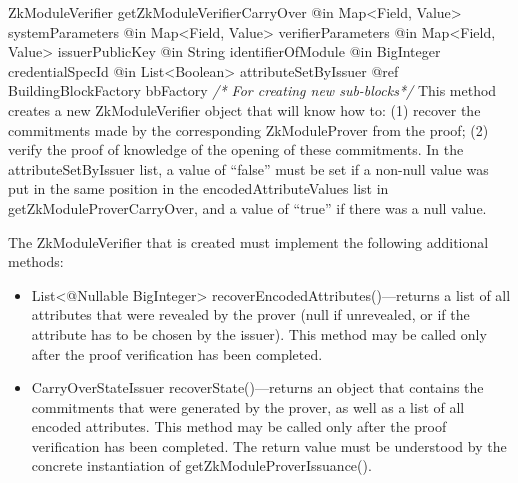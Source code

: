       \begin{method}
      {ZkModuleVerifier}
      {getZkModuleVerifierCarryOver}
      {
        {@in Map<Field, Value> systemParameters}
        {@in Map<Field, Value> verifierParameters}
        {@in Map<Field, Value> issuerPublicKey}
        {@in String identifierOfModule}
        {@in BigInteger credentialSpecId}
        {@in List<Boolean> attributeSetByIssuer}
        {@ref BuildingBlockFactory bbFactory \textrm{\emph{/* For creating new sub-blocks*/}}}
      }
      This method creates a new ZkModuleVerifier object that will know how to:
      (1) recover the commitments made by the corresponding ZkModuleProver from the proof;
      (2) verify the proof of knowledge of the opening of these commitments.
      In the attributeSetByIssuer list, a value of ``false'' must be set if a non-null value
      was put in the same position in the encodedAttributeValues list in getZkModuleProverCarryOver,
      and a value of ``true'' if there was a null value.

      The ZkModuleVerifier that is created must implement the following additional methods:
        \begin{itemize}
          \item List<@Nullable BigInteger> recoverEncodedAttributes()---returns a list of all attributes
                that were revealed by the prover (null if unrevealed, or if the attribute has to be
                chosen by the issuer). This method may be called only after the proof verification has been
                completed.
          \item CarryOverStateIssuer recoverState()---returns an object that contains
                the commitments that were generated by the prover,
                as well as a list of all encoded attributes.
                This method may be called only after the proof verification has been completed. The
                return value must be understood by the concrete instantiation of getZkModuleProverIssuance().
        \end{itemize}
      \end{method}

